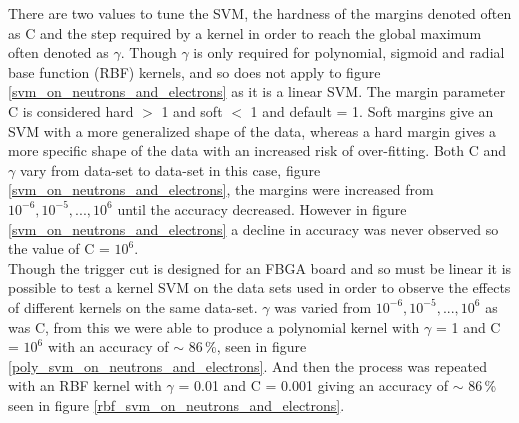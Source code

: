 \documentclass[12pt,a4paper]{article}
\begin{document}
There are two values to tune the SVM, the hardness of the margins denoted often as C and the step required by a kernel in order to reach the global maximum often denoted as $\gamma$. Though $\gamma$ is only required for polynomial, sigmoid and radial base function (RBF) kernels, and so does not apply to figure \ref{svm_on_neutrons_and_electrons} as it is a linear SVM. The margin parameter C is considered hard $>$ 1 and soft $<$ 1 and default = 1. Soft margins give an SVM with a more generalized shape of the data, whereas a hard margin gives a more specific shape of the data with an increased risk of over-fitting. Both C and $\gamma$ vary from data-set to data-set in this case, figure \ref{svm_on_neutrons_and_electrons}, the margins were increased from $10^{-6}, 10^{-5}, ..., 10^6$ until the accuracy decreased. However in figure \ref{svm_on_neutrons_and_electrons} a decline in accuracy was never observed so the value of C = $10^6$.\\

Though the trigger cut is designed for an FBGA board and so must be linear it is possible to test a kernel SVM on the data sets used in order to observe the effects of different kernels on the same data-set. $\gamma$ was varied from $10^{-6}, 10^{-5}, ..., 10^6$ as was C, from this we were able to produce a polynomial kernel with $\gamma$ = 1 and C = $10^6$ with an accuracy of $\sim$ 86\,\%, seen in figure \ref{poly_svm_on_neutrons_and_electrons}. And then the process was repeated with an RBF kernel with $\gamma$ = 0.01 and C = 0.001 giving an accuracy of $\sim$ 86\,\% seen in figure \ref{rbf_svm_on_neutrons_and_electrons}.
\end{document}
